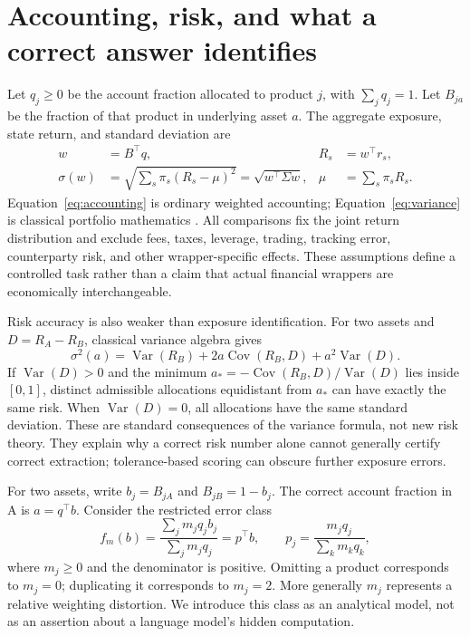 \section{Accounting, risk, and what a correct answer identifies}\label{sec:theory}
Let $q_j\geq0$ be the account fraction allocated to product $j$, with $\sum_jq_j=1$. Let $B_{ja}$ be the fraction of that product in underlying asset $a$. The aggregate exposure, state return, and standard deviation are
\begin{align}
 w&=B^\top q, & R_s&=w^\top r_s,\label{eq:accounting}\\
 \sigma(w)&=\sqrt{\sum_s\pi_s(R_s-\mu)^2}
           =\sqrt{w^\top\Sigma w},&\mu&=\sum_s\pi_sR_s.\label{eq:variance}
\end{align}
Equation~\ref{eq:accounting} is ordinary weighted accounting; Equation~\ref{eq:variance} is classical portfolio mathematics \citep{markowitz1952}. All comparisons fix the joint return distribution and exclude fees, taxes, leverage, trading, tracking error, counterparty risk, and other wrapper-specific effects. These assumptions define a controlled task rather than a claim that actual financial wrappers are economically interchangeable.

Risk accuracy is also weaker than exposure identification. For two assets and $D=R_A-R_B$, classical variance algebra gives
\begin{equation}
\sigma^2(a)=\operatorname{Var}(R_B)+2a\operatorname{Cov}(R_B,D)+a^2\operatorname{Var}(D).
\end{equation}
If $\operatorname{Var}(D)>0$ and the minimum $a_*=-\operatorname{Cov}(R_B,D)/\operatorname{Var}(D)$ lies inside $[0,1]$, distinct admissible allocations equidistant from $a_*$ can have exactly the same risk. When $\operatorname{Var}(D)=0$, all allocations have the same standard deviation. These are standard consequences of the variance formula, not new risk theory. They explain why a correct risk number alone cannot generally certify correct extraction; tolerance-based scoring can obscure further exposure errors.

For two assets, write $b_j=B_{jA}$ and $B_{jB}=1-b_j$. The correct account fraction in A is $a=q^\top b$. Consider the restricted error class
\begin{equation}
 f_m(b)=\frac{\sum_jm_jq_jb_j}{\sum_jm_jq_j}=p^\top b,
 \qquad p_j=\frac{m_jq_j}{\sum_km_kq_k},\label{eq:errorclass}
\end{equation}
where $m_j\geq0$ and the denominator is positive. Omitting a product corresponds to $m_j=0$; duplicating it corresponds to $m_j=2$. More generally $m_j$ represents a relative weighting distortion. We introduce this class as an analytical model, not as an assertion about a language model's hidden computation.

